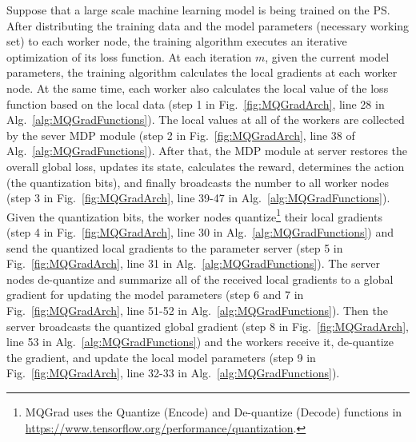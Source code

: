 \documentclass[sigconf]{acmart}
\begin{document}

Suppose that a large scale machine learning model is being trained on the PS. After distributing the training data and the model parameters (necessary working set) to each worker node, the training algorithm executes an iterative optimization of its loss function. At each iteration $m$, given the current model parameters, the training algorithm calculates the local gradients at each worker node. At the same time, each worker also calculates the local value of the loss function based on the local data (step 1 in Fig.~\ref{fig:MQGradArch}, line 28 in Alg.~\ref{alg:MQGradFunctions}). The local values at all of the workers are collected by the sever MDP module (step 2 in Fig.~\ref{fig:MQGradArch}, line 38 of Alg.~\ref{alg:MQGradFunctions}). After that, the MDP module at server restores the overall global loss, updates its state, calculates the reward, determines the action (the quantization bits), and finally broadcasts the number to all worker nodes (step 3 in Fig.~\ref{fig:MQGradArch}, line 39-47 in Alg.~\ref{alg:MQGradFunctions}). Given the quantization bits, the worker nodes quantize\footnote{MQGrad uses the Quantize (Encode) and De-quantize (Decode) functions in \url{https://www.tensorflow.org/performance/quantization}.} their local gradients (step 4 in Fig.~\ref{fig:MQGradArch}, line 30 in Alg.~\ref{alg:MQGradFunctions}) and send the quantized local gradients to the parameter server (step 5 in Fig.~\ref{fig:MQGradArch}, line 31 in Alg.~\ref{alg:MQGradFunctions}). The server nodes de-quantize and summarize all of the received local gradients to a global gradient for updating the model parameters (step 6 and 7 in Fig.~\ref{fig:MQGradArch}, line 51-52 in Alg.~\ref{alg:MQGradFunctions}). Then the server broadcasts the quantized global gradient (step 8 in Fig.~\ref{fig:MQGradArch}, line 53 in Alg.~\ref{alg:MQGradFunctions}) and the workers receive it, de-quantize the gradient, and update the local model parameters (step 9 in Fig.~\ref{fig:MQGradArch}, line 32-33 in Alg.~\ref{alg:MQGradFunctions}).

\end{document}
